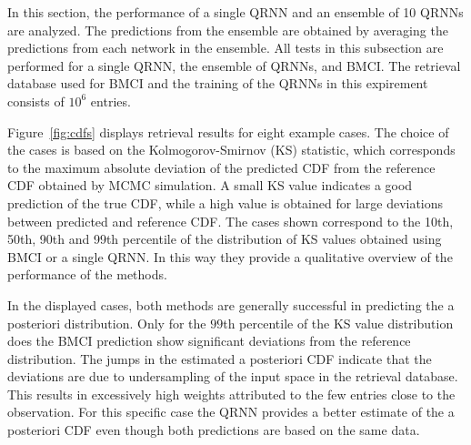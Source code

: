 \documentclass[journal abbreviation, manuscript]{copernicus}
\begin{document}
  In this section, the performance of a single QRNN and an ensemble of 10 QRNNs
  are analyzed. The predictions from the ensemble are obtained by averaging the
  predictions from each network in the ensemble. All tests in this subsection are
  performed for a single QRNN, the ensemble of QRNNs, and BMCI. The retrieval database used
  for BMCI and the training of the QRNNs in this expirement consists of $10^6$ entries.

    Figure~\ref{fig:cdfs} displays retrieval results for eight example cases. The
choice of the cases is based on the Kolmogorov-Smirnov (KS) statistic, which
corresponds to the maximum absolute deviation of the predicted CDF from the
reference CDF obtained by MCMC simulation. A small KS value indicates a good
prediction of the true CDF, while a high value is obtained for large deviations
between predicted and reference CDF. The cases shown correspond to the 10th, 50th,
 90th and 99th percentile of the distribution of KS values obtained using BMCI
or a single QRNN. In this way they provide a qualitative overview of the performance
of the methods.

In the displayed cases, both methods are generally successful in predicting the
a posteriori distribution. Only for the $99$th percentile of the KS value distribution
does the BMCI prediction show significant deviations from the reference distribution.
 The jumps in the estimated a posteriori CDF indicate that the deviations are due to
undersampling of the input space in the retrieval database. This results in
excessively high weights attributed to the few entries close to the
observation. For this specific case the QRNN provides a better estimate of the a
posteriori CDF even though both predictions are based on the same data.
\end{document}
